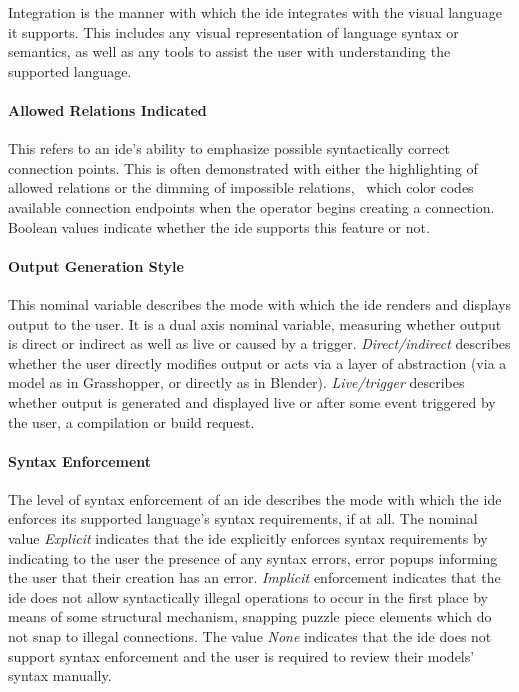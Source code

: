 Integration is the manner with which the \ac{ide} integrates with the visual
language it supports. This includes any visual representation of language
syntax or semantics, as well as any tools to assist the user with
understanding the supported language.


\paragraph{Allowed Relations Indicated}
This refers to an \ac{ide}'s ability to
emphasize possible syntactically correct connection points. This is often
demonstrated with either the highlighting of allowed relations or the
dimming of impossible relations, \eg \cameleon~which color codes available
connection endpoints when the operator begins creating a connection.
Boolean values indicate whether the \ac{ide} supports this feature or not.


\paragraph{Output Generation Style}
This nominal variable describes the
mode with which the \ac{ide} renders and displays output to the user. It is a
dual axis nominal variable, measuring whether output is direct or indirect
as well as live or caused by a trigger. \textsl{Direct/indirect} describes
whether the user directly modifies output or acts via a layer of
abstraction (\eg via a model as in Grasshopper, or directly as in Blender).
\textsl{Live/trigger} describes whether output is generated and displayed
live or after some event triggered by the user, \eg a compilation or build
request.


\paragraph{Syntax Enforcement}
The level of syntax enforcement of an \ac{ide} describes the mode with
which the \ac{ide} enforces its supported language's syntax requirements,
if at all. The nominal value \textsl{Explicit}
indicates that the \ac{ide} explicitly enforces syntax requirements by
indicating to the user the presence of any syntax errors, \eg error popups
informing the user that their creation has an error. \textsl{Implicit}
enforcement indicates that the \ac{ide} does not allow syntactically illegal
operations to occur in the first place by means of some structural
mechanism, \eg snapping puzzle piece elements which do not snap to illegal
connections. The value \textsl{None} indicates that the \ac{ide} does not
support syntax enforcement and the user is required to review their models'
syntax manually.


